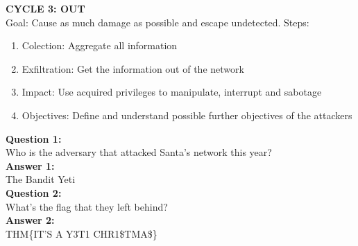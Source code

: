 \textbf{CYCLE 3: OUT}\\
Goal: Cause as much damage as possible and escape undetected. 
Steps:
\begin{enumerate}
\item Colection: Aggregate all information
\item Exfiltration: Get the information out of the network
\item Impact: Use acquired privileges to manipulate, interrupt and sabotage
\item Objectives: Define and understand possible further objectives of the attackers
\end{enumerate}

\textbf{Question 1:}\\
Who is the adversary that attacked Santa's network this year?\\
\textbf{Answer 1:}\\
The Bandit Yeti\\

\textbf{Question 2:}\\
What's the flag that they left behind?\\
\textbf{Answer 2:}\\
THM\{IT'S A Y3T1 CHR1\$TMA\$\}
